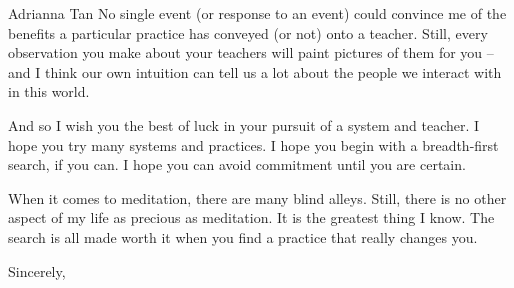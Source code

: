 \documentclass{letter}
\newcommand\hr{\par\vspace{-.5\ht\strutbox}\noindent\hrulefill\par}
\begin{document}
\begin{letter}{Adrianna Tan}
No single event (or response to an event) could convince me of the benefits a particular practice has conveyed (or not) onto a teacher.
Still, every observation you make about your teachers will paint pictures of them for you -- and I think our own intuition can tell us a lot about the people we interact with in this world.

\hr

And so I wish you the best of luck in your pursuit of a system and teacher.
I hope you try many systems and practices.
I hope you begin with a breadth-first search, if you can.
I hope you can avoid commitment until you are certain.

When it comes to meditation, there are many blind alleys.
Still, there is no other aspect of my life as precious as meditation.
It is the greatest thing I know.
The search is all made worth it when you find a practice that really changes you.

\closing{Sincerely,}


\end{letter}
\end{document}
